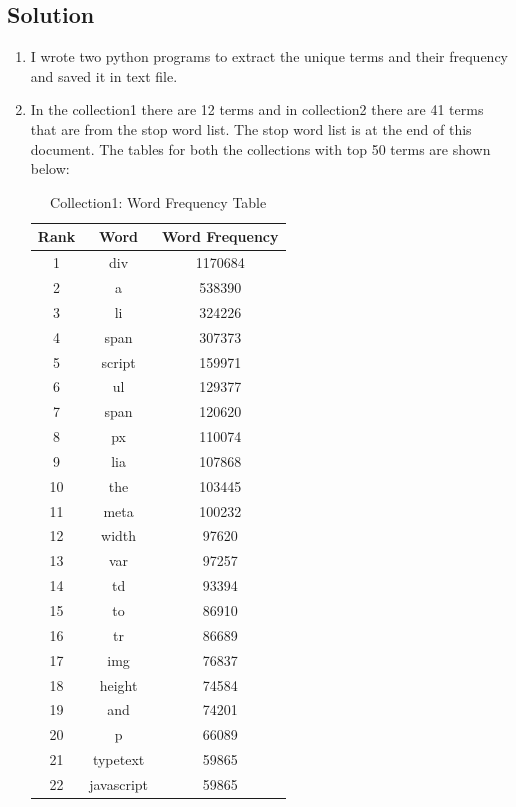 \subsection{Solution}
\begin{enumerate}

\item I wrote two python programs to extract the unique terms and their frequency and saved it in text file.

\item In the collection1 there are 12 terms and in collection2 there are 41 terms that are from the stop word list. The stop word list is at the end of this document. The tables for both the collections with top 50 terms are shown below:

	\begin{table}
		\caption{Collection1: Word Frequency Table}
			\begin{center}
				\begin{tabular}{ c | c | c }
					\hline
Rank & Word & Word Frequency \\ \hline
1 & div & 1170684 \\ \hline
2 & a & 538390 \\ \hline
3 & li & 324226 \\ \hline
4 & span & 307373 \\ \hline
5 & script & 159971 \\ \hline
6 & ul & 129377 \\ \hline
7 & span & 120620 \\ \hline
8 & px & 110074 \\ \hline
9 & lia & 107868 \\ \hline
10 & the & 103445 \\ \hline
11 & meta & 100232 \\ \hline
12 & width & 97620 \\ \hline
13 & var & 97257 \\ \hline
14 & td & 93394 \\ \hline
15 & to & 86910 \\ \hline
16 & tr & 86689 \\ \hline
17 & img & 76837 \\ \hline
18 & height & 74584 \\ \hline
19 & and & 74201 \\ \hline
20 & p & 66089 \\ \hline
21 & typetext & 59865 \\ \hline
22 & javascript & 59865 \\ \hline

\end{tabular}
\end{center}
\end{table}
\end{enumerate}

